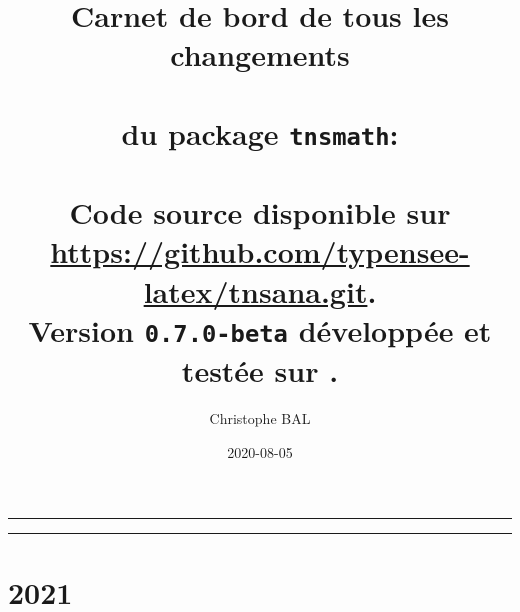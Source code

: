 \documentclass[12pt,a4paper]{book}
\begin{document}
\renewcommand\labelitemi{\raisebox{0.125em}{\tiny\textbullet}}
\renewcommand{\labelitemii}{---}

\title{ %
	Carnet de bord de tous les changements\\%
	\\%
	du package \texttt{tnsmath}:\\%
	\\%
	{\footnotesize Code source disponible sur \url{https://github.com/typensee-latex/tnsana.git}.}%
	\\%
    {\footnotesize Version \texttt{0.7.0-beta} développée et testée sur \macosxname{}.}%
}
\author{Christophe BAL}
\date{2020-08-05}

\maketitle


\vspace{2em}

\hrule

\tableofcontents

\vspace{1.5em}

\hrule

\newpage





\section{2021}
\end{document}
